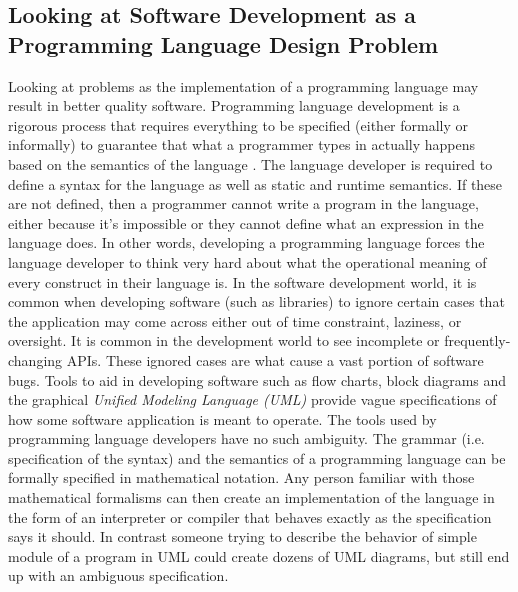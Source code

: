 \subsection{Looking at Software Development as a Programming Language Design Problem}
Looking at problems as the implementation of a programming language may result in better quality software. Programming language development is a rigorous process that requires everything to be specified (either formally or informally) to guarantee that what a programmer types in actually happens based on the semantics of the language \citep{mauw:languagedrivendesign}. The language developer is required to define a syntax for the language as well as static and runtime semantics. If these are not defined, then a programmer cannot write a program in the language, either because it's impossible or they cannot define what an expression in the language does. In other words, developing a programming language forces the language developer to think very hard about what the operational meaning of every construct in their language is. In the software development world, it is common when developing software (such as libraries) to ignore certain cases that the application may come across either out of time constraint, laziness, or oversight. It is common in the development world to see incomplete or frequently-changing APIs. These ignored cases are what cause a vast portion of software bugs. Tools to aid in developing software such as flow charts, block diagrams and the graphical \textit{Unified Modeling Language (UML)} provide vague specifications of how some software application is meant to operate. The tools used by programming language developers have no such ambiguity. The grammar (i.e. specification of the syntax) and the semantics of a programming language can be formally specified in mathematical notation. Any person familiar with those mathematical formalisms can then create an implementation of the language in the form of an interpreter or compiler that behaves exactly as the specification says it should. In contrast someone trying to describe the behavior of simple module of a program in UML could create dozens of UML diagrams, but still end up with an ambiguous specification.

